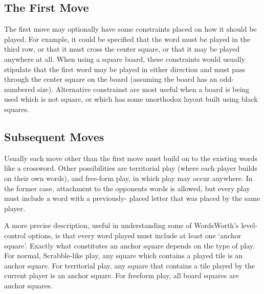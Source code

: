 
\subsection{The First Move}

The first move may optionally have some constraints placed on how it
should be played. For example, it could be specified that the word
must be played in the third row, or that it must cross the center
square, or that it may be played anywhere at all. When using a square
board, these constraints would usually stipulate that the first word
may be played in either direction and must pass through the center
square on the board (assuming the board has an odd-numbered size).
Alternative constrainst are most useful when a board is being used
which is not square, or which has some unorthodox layout built using
black squares.

\subsection{Subsequent Moves}

Usually each move other than the first move must build on to the
existing words like a crossword. Other possibilities are territorial
play (where each player builds on their own words), and free-form
play, in which play may occur anywhere. In the former case,
attachment to the opponents words is allowed, but every play must
include a word with a previously- placed letter that was placed by
the same player.

A more precise description, useful in understanding some of
WordsWorth's level-control options, is that every word played must
include at least one `anchor square'. Exactly what constitutes an
anchor square depends on the type of play. For normal, Scrabble-like
play, any square which contains a played tile is an anchor square.
For territorial play, any square that contains a tile played by the
current player is an anchor square. For freeform play, all board
squares are anchor squares.

